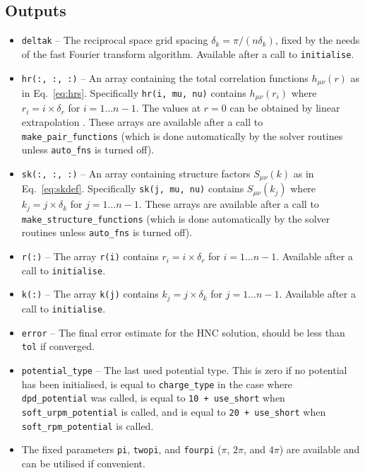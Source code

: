 \documentclass[12pt,a4paper]{article}
\newcommand{\Eqref}[1]{Eq.~\eqref{#1}}
\begin{document}
\subsection{Outputs}
%
\begin{itemize}
%
\item\verb+deltak+ -- The reciprocal space grid spacing
  $\delta_k=\pi/(n\delta_k)$, fixed by the needs of the fast Fourier
  transform algorithm.  Available after a call to \verb+initialise+.
%
\item\verb+hr(:, :, :)+ -- An array containing the total correlation
  functions $h_{\mu\nu}(r)$ as in \Eqref{eq:hrs}.  Specifically
  \verb+hr(i, mu, nu)+ contains $h_{\mu\nu}(r_i)$ where
  $r_i=i\times\delta_r$ for $i=1\dots n-1$.  The values at $r=0$ can
  be obtained by linear extrapolation \cite{KMP04}.  These arrays are
  available after a call to \verb+make_pair_functions+ (which is done
  automatically by the solver routines unless \verb+auto_fns+ is
  turned off).
%
\item\verb+sk(:, :, :)+ -- An array containing structure factors
  $S_{\mu\nu}(k)$ as in \Eqref{eq:skdef}.  Specifically
  \verb+sk(j, mu, nu)+ contains $S_{\mu\nu}(k_j)$ where
  $k_j=j\times\delta_k$ for $j=1\dots n-1$. These arrays are available
  after a call to \verb+make_structure_functions+ (which is done
  automatically by the solver routines unless \verb+auto_fns+ is
  turned off).
%
\item\verb+r(:)+ -- The array \verb+r(i)+ contains
  $r_i=i\times\delta_r$ for $i=1\dots n-1$.  Available after a call to
  \verb+initialise+.
%
\item\verb+k(:)+ -- The array \verb+k(j)+ contains
  $k_j=j\times\delta_k$ for $j=1\dots n-1$.  Available after a call to
  \verb+initialise+.
%
\item\verb+error+ -- The final error estimate for the HNC solution, should
  be less than \verb+tol+ if converged.
%
\item\verb+potential_type+ -- The last used potential type. This is
  zero if no potential has been initialised, is equal to
  \verb+charge_type+ in the case where \verb+dpd_potential+ was
  called, is equal to \verb:10 + use_short: when
  \verb+soft_urpm_potential+ is called, and is equal to
  \verb:20 + use_short: when \verb+soft_rpm_potential+ is called.
%
\item The fixed parameters \verb+pi+, \verb+twopi+, and \verb+fourpi+ 
($\pi$, $2\pi$, and $4\pi$) are available and can be utilised if
convenient.
%
\end{itemize}
\end{document}
